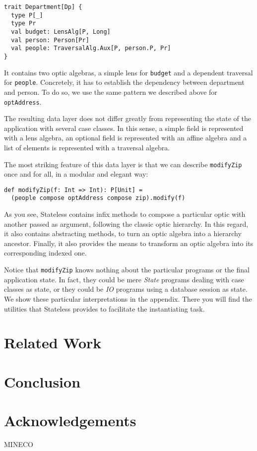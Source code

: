 \documentclass[preview, 3p]{elsarticle}
\begin{document}
\begin{lstlisting}
trait Department[Dp] {
  type P[_]
  type Pr
  val budget: LensAlg[P, Long]
  val person: Person[Pr]
  val people: TraversalAlg.Aux[P, person.P, Pr]
}
\end{lstlisting}

It contains two optic algebras, a simple lens for \lstinline{budget} and a
dependent traversal for \lstinline{people}. Concretely, it has to establish the
dependency between department and person. To do so, we use the same pattern we
described above for \lstinline{optAddress}.

The resulting data layer does not differ greatly from representing the state of
the application with several case classes. In this sense, a simple field is
represented with a lens algebra, an optional field is represented with an affine
algebra and a list of elements is represented with a traversal algebra.

The most striking feature of this data layer is that we can describe
\lstinline{modifyZip} once and for all, in a modular and elegant way:

\begin{lstlisting}
def modifyZip(f: Int => Int): P[Unit] =
  (people compose optAddress compose zip).modify(f)
\end{lstlisting}

As you see, Stateless contains infix methods to compose a particular optic with
another passed as argument, following the classic optic hierarchy. In this
regard, it also contains abstracting methods, to turn an optic algebra into a
hierarchy ancestor. Finally, it also provides the means to transform an optic
algebra into its corresponding indexed one.

Notice that \lstinline{modifyZip} knows nothing about the particular programs or
the final application state. In fact, they could be mere \emph{State} programs
dealing with case classes as state, or they could be \emph{IO} programs using a
database session as state. We show these particular interpretations in the
appendix. There you will find the utilities that Stateless provides to
facilitate the instantiating task.



\section{Related Work}
\label{sec:Discussion}

\section{Conclusion}



\section*{Acknowledgements}
MINECO

{}

\end{document}
